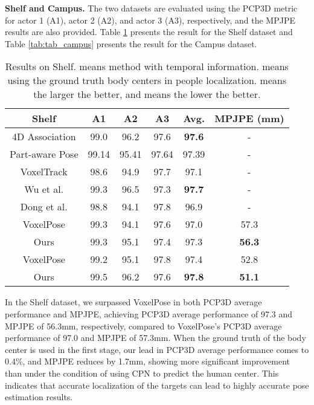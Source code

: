 \documentclass[lettersize,journal]{IEEEtran}
\begin{document}
\par \textbf{Shelf and Campus.}  The two datasets are evaluated using the PCP3D metric for actor 1 (A1), actor 2 (A2), and actor 3 (A3), respectively, and the MPJPE results are also provided. Table \ref{tab:tab_shelf} presents the result for the Shelf dataset and Table \ref{tab:tab_campus} presents the result for the Campus dataset.

\begin{table}[!htbp]
\centering
\caption{Results on Shelf.  means method with temporal information.  means using the ground truth body centers in people localization.  means the larger the better, and  means the lower the better.}

\resizebox{\linewidth}{!} {
\begin{tabular}{cccccc}
\hline
Shelf & A1 & A2 & A3 & Avg. & MPJPE (mm) \\
\hline
 4D Association \cite{zhang20204d} & 99.0 & 96.2 & 97.6 & \textbf{97.6} & -\\
 Part-aware Pose \cite{chu2021part} & 99.14 & 95.41 & 97.64 & 97.39 & -\\
 VoxelTrack \cite{zhang2021voxeltrack} & 98.6 & 94.9 & 97.7 & 97.1 & -\\

\hline

Wu et al. \cite{wu2021graph} & 99.3 & 96.5 & 97.3 & \textbf{97.7} & - \\

Dong et al. \cite{dong2019fast} & 98.8 & 94.1 & 97.8 & 96.9 & - \\
VoxelPose \cite{tu2020voxelpose} & 99.3& 94.1 & 97.6 & 97.0 & 57.3\\
Ours & 99.3 & 95.1 & 97.4 & 97.3 & \textbf{56.3} \\
\hline
 VoxelPose \cite{tu2020voxelpose} & 99.2 & 95.1 & 97.8 & 97.4 & 52.8\\
 Ours  & 99.5 & 96.2 & 97.6 & \textbf{97.8} & \textbf{51.1}  \\
\hline
\end{tabular}
}
\label{tab:tab_shelf}
\end{table}

\par In the Shelf dataset, we surpassed VoxelPose in both PCP3D average performance and MPJPE, achieving PCP3D average performance of 97.3 and MPJPE of 56.3mm, respectively, compared to VoxelPose's PCP3D average performance of 97.0 and MPJPE of 57.3mm. When the ground truth of the body center is used in the first stage, our lead in PCP3D average performance comes to 0.4\%, and MPJPE reduces by 1.7mm, showing more significant improvement than under the condition of using CPN to predict the human center. This indicates that accurate localization of the targets can lead to highly accurate pose estimation results. 
\end{document}
